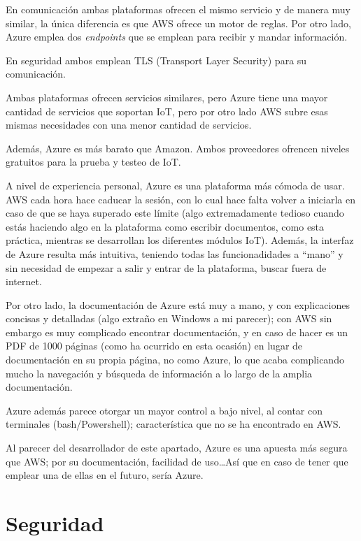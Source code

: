 \documentclass[english,runningheads,a4paper]{llncs}[2018/03/10]
\begin{document}
En comunicación ambas plataformas ofrecen el mismo servicio y de manera muy
similar, la única diferencia es que AWS ofrece un motor de reglas. Por otro
lado, Azure emplea dos \textit{endpoints} que se emplean para recibir y mandar
información.

En seguridad ambos emplean TLS (Transport Layer Security) para su comunicación.

Ambas plataformas ofrecen servicios similares, pero Azure tiene una mayor
cantidad de servicios que soportan IoT, pero por otro lado AWS subre esas mismas
necesidades con una menor cantidad de servicios.

Además, Azure es más barato que Amazon. Ambos proveedores ofrencen niveles
gratuitos para la prueba y testeo de IoT.

A nivel de experiencia personal, Azure es una plataforma más cómoda de usar. AWS
cada hora hace caducar la sesión, con lo cual hace falta volver a iniciarla en
caso de que se haya superado este límite (algo extremadamente tedioso cuando
estás haciendo algo en la plataforma como escribir documentos, como esta
práctica, mientras se desarrollan los diferentes módulos IoT). Además, la
interfaz de Azure resulta más intuitiva, teniendo todas las funcionadidades a
``mano'' y sin necesidad de empezar a salir y entrar de la plataforma, buscar
fuera de internet.

Por otro lado, la documentación de Azure está muy a mano, y con explicaciones
concisas y detalladas (algo extraño en Windows a mi parecer); con AWS sin
embargo es muy complicado encontrar documentación, y en caso de hacer es un PDF
de 1000 páginas (como ha ocurrido en esta ocasión) en lugar de documentación en
su propia página, no como Azure, lo que acaba complicando mucho la navegación y
búsqueda de información a lo largo de la amplia documentación.

Azure además parece otorgar un mayor control a bajo nivel, al contar con
terminales (bash/Powershell); característica que no se ha encontrado en AWS.

Al parecer del desarrollador de este apartado, Azure es una apuesta más segura
que AWS; por su documentación, facilidad de uso\ldots Así que en caso de tener
que emplear una de ellas en el futuro, sería Azure.

\newpage

\section{Seguridad}
\end{document}
